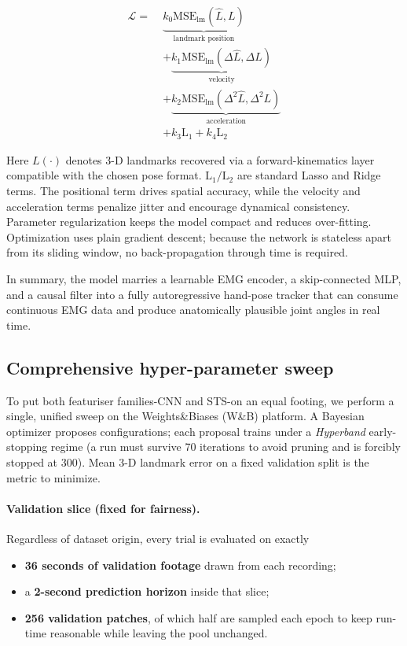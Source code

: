 \begin{align*}
\mathcal{L} =\;&
\underbrace{k_0\mathrm{MSE}_{\text{lm}}(\hat L, L)}_{\text{landmark position}} \\
&+ \underbrace{k_1\mathrm{MSE}_{\text{lm}}(\Delta \hat L, \Delta L)}_{\text{velocity}} \\
&+ \underbrace{k_2\mathrm{MSE}_{\text{lm}}(\Delta^{2} \hat L, \Delta^{2} L)}_{\text{acceleration}} \\
&+ k_3\text{L}_{1} + k_4\text{L}_{2}
\end{align*}

Here \(L(\cdot)\) denotes 3-D landmarks recovered via a forward-kinematics layer compatible with the chosen pose format. $\text{L}_{1} / \text{L}_{2}$ are standard Lasso and Ridge terms. The positional term drives spatial accuracy, while the velocity and acceleration terms penalize jitter and encourage dynamical consistency. Parameter regularization keeps the model compact and reduces over-fitting.
Optimization uses plain gradient descent; because the network is stateless apart from its sliding window, no back-propagation through time is required.

\medskip\noindent
In summary, the model marries a learnable EMG encoder, a skip-connected MLP, and a causal filter into a fully autoregressive hand-pose tracker that can consume continuous EMG data and produce anatomically plausible joint angles in real time.

\subsection{Comprehensive hyper-parameter sweep}

To put both featuriser families-CNN and STS-on an equal footing, we perform a single, unified sweep on the Weights\&Biases (W\&B) platform.
A Bayesian optimizer proposes configurations; each proposal trains under a \emph{Hyperband} early-stopping regime (a run must survive 70 iterations to avoid pruning and is forcibly stopped at 300).
Mean 3-D landmark error on a fixed validation split is the metric to minimize.

\paragraph{Validation slice (fixed for fairness).}
Regardless of dataset origin, every trial is evaluated on exactly

\begin{itemize}
  \item \textbf{36 seconds of validation footage} drawn from each recording;
  \item a \textbf{2-second prediction horizon} inside that slice;
  \item \textbf{256 validation patches}, of which half are sampled each epoch
        to keep run-time reasonable while leaving the pool unchanged.
\end{itemize}

